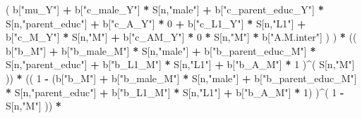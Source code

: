 \documentclass[
]{book}
\newenvironment{Shaded}{\begin{snugshade}}{\end{snugshade}}
\newcommand{\DecValTok}[1]{\textcolor[rgb]{0.00,0.00,0.81}{#1}}
\newcommand{\NormalTok}[1]{#1}
\newcommand{\SpecialCharTok}[1]{\textcolor[rgb]{0.81,0.36,0.00}{\textbf{#1}}}
\newcommand{\StringTok}[1]{\textcolor[rgb]{0.31,0.60,0.02}{#1}}
\begin{document}
\begin{Shaded}
\begin{Highlighting}[]
\NormalTok{                           ( b[}\StringTok{"mu\_Y"}\NormalTok{] }\SpecialCharTok{+} 
\NormalTok{                               b[}\StringTok{"c\_male\_Y"}\NormalTok{] }\SpecialCharTok{*}\NormalTok{ S[n,}\StringTok{"male"}\NormalTok{] }\SpecialCharTok{+} 
\NormalTok{                               b[}\StringTok{"c\_parent\_educ\_Y"}\NormalTok{] }\SpecialCharTok{*}\NormalTok{ S[n,}\StringTok{"parent\_educ"}\NormalTok{] }\SpecialCharTok{+} 
\NormalTok{                               b[}\StringTok{"c\_A\_Y"}\NormalTok{] }\SpecialCharTok{*} \DecValTok{0} \SpecialCharTok{+} 
\NormalTok{                               b[}\StringTok{"c\_L1\_Y"}\NormalTok{] }\SpecialCharTok{*}\NormalTok{ S[n,}\StringTok{"L1"}\NormalTok{] }\SpecialCharTok{+}
\NormalTok{                               b[}\StringTok{"c\_M\_Y"}\NormalTok{] }\SpecialCharTok{*}\NormalTok{ S[n,}\StringTok{"M"}\NormalTok{] }\SpecialCharTok{+} 
\NormalTok{                               b[}\StringTok{"c\_AM\_Y"}\NormalTok{] }\SpecialCharTok{*} \DecValTok{0} \SpecialCharTok{*}\NormalTok{ S[n,}\StringTok{"M"}\NormalTok{] }\SpecialCharTok{*}\NormalTok{ b[}\StringTok{"A.M.inter"}\NormalTok{] ) ) }\SpecialCharTok{*}
\NormalTok{      (( b[}\StringTok{"b\_M"}\NormalTok{] }\SpecialCharTok{+} 
\NormalTok{           b[}\StringTok{"b\_male\_M"}\NormalTok{] }\SpecialCharTok{*}\NormalTok{ S[n,}\StringTok{"male"}\NormalTok{] }\SpecialCharTok{+} 
\NormalTok{           b[}\StringTok{"b\_parent\_educ\_M"}\NormalTok{] }\SpecialCharTok{*}\NormalTok{ S[n,}\StringTok{"parent\_educ"}\NormalTok{] }\SpecialCharTok{+}
\NormalTok{           b[}\StringTok{"b\_L1\_M"}\NormalTok{] }\SpecialCharTok{*}\NormalTok{ S[n,}\StringTok{"L1"}\NormalTok{] }\SpecialCharTok{+}
\NormalTok{           b[}\StringTok{"b\_A\_M"}\NormalTok{] }\SpecialCharTok{*} \DecValTok{1}\NormalTok{ )}\SpecialCharTok{\^{}}\NormalTok{( S[n,}\StringTok{"M"}\NormalTok{] )) }\SpecialCharTok{*} 
\NormalTok{      (( }\DecValTok{1} \SpecialCharTok{{-}}\NormalTok{ (b[}\StringTok{"b\_M"}\NormalTok{] }\SpecialCharTok{+} 
\NormalTok{                b[}\StringTok{"b\_male\_M"}\NormalTok{] }\SpecialCharTok{*}\NormalTok{ S[n,}\StringTok{"male"}\NormalTok{] }\SpecialCharTok{+} 
\NormalTok{                b[}\StringTok{"b\_parent\_educ\_M"}\NormalTok{] }\SpecialCharTok{*}\NormalTok{ S[n,}\StringTok{"parent\_educ"}\NormalTok{] }\SpecialCharTok{+} 
\NormalTok{                b[}\StringTok{"b\_L1\_M"}\NormalTok{] }\SpecialCharTok{*}\NormalTok{ S[n,}\StringTok{"L1"}\NormalTok{] }\SpecialCharTok{+}
\NormalTok{                b[}\StringTok{"b\_A\_M"}\NormalTok{] }\SpecialCharTok{*} \DecValTok{1}\NormalTok{) )}\SpecialCharTok{\^{}}\NormalTok{( }\DecValTok{1} \SpecialCharTok{{-}}\NormalTok{ S[n,}\StringTok{"M"}\NormalTok{] ))  }\SpecialCharTok{*}

\end{Highlighting}
\end{Shaded}
\end{document}
